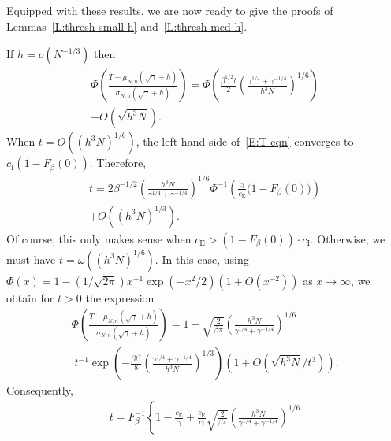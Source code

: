 \documentclass[final]{IEEEtran} %
\newcommand{\ce}{c_\text{E}}
\newcommand{\ci}{c_\text{I}}
\begin{document}
Equipped with these results, we are now ready to give the proofs of Lemmas~\ref{L:thresh-small-h} and~\ref{L:thresh-med-h}.
\begin{IEEEproof}
If $h = o\left(N^{-1/3}\right)$ then
\begin{multline*}
    \Phi \!
    \left(
        \frac{ T - \mu_{N,n}(\sqrt{\gamma} + h)}
             { \sigma_{N,n}(\sqrt{\gamma} + h) }
    \right)
    =
    \Phi \!
    \left(
    \frac{\beta^{1/2}t}{2}
    \left(
        \frac{\gamma^{1/4} + \gamma^{-1/4}}{ h^3 N }
    \right)^{1/6}
    \right)
    \\
    +
    O\left(\sqrt{h^3 N} \right)
    .
\end{multline*}
When $t = O\left((h^3 N)^{1/6}\right)$, the left-hand side of~\eqref{E:T-eqn} converges to $\ci ( 1 - F_\beta(0))$.  Therefore,
\begin{multline*}
    t
    =
    2
    \beta^{-1/2}
    \left(
        \frac{ h^3 N }{\gamma^{1/4} + \gamma^{-1/4}}
    \right)^{1/6}
    \Phi^{-1}
    \left(
        \frac{\ci}{\ce}
        \Big( 1 - F_\beta(0) \Big)
    \right)
    \\
    +
    O\left( (h^3 N)^{1/3} \right)
    .
\end{multline*}
Of course, this only makes sense when $\ce > (1 - F_\beta(0)) \cdot \ci$.
Otherwise, we must have $t = \omega\left((h^3 N)^{1/6} \right)$.  In this
case, using $\Phi(x) = 1 - (1/\sqrt{2 \pi}) x^{-1} \exp(-x^2/2)(1 + O(x^{-2}))$
as $x \to \infty$, we obtain for $t > 0$ the expression
\begin{multline*}
    \Phi
    \left(
        \frac{ T - \mu_{N,n}(\sqrt{\gamma} + h)}
             { \sigma_{N,n}(\sqrt{\gamma} + h) }
    \right)
    =
    1
    -
    \sqrt{\frac{2}{\beta \pi}}
    \left(
        \frac{ h^3 N }{\gamma^{1/4} + \gamma^{-1/4}}
    \right)^{1/6}
    \\
    \cdot t^{-1}
    \exp
    \left(
        -\frac{\beta t^2}{8}
        \left(
            \frac{\gamma^{1/4} + \gamma^{-1/4}}{ h^3 N }
        \right)^{1/3}
    \right)
    \left( 1 + O \left(\sqrt{h^3 N}/t^3 \right) \right).
\end{multline*}
Consequently,
\begin{multline*}
    t
    = F_\beta^{-1}
       \left\{
           1 - \frac{\ce}{\ci}
           +
           \frac{\ce}{\ci}
           \sqrt{\frac{2}{\beta \pi}}
           \left(
               \frac{ h^3 N }{\gamma^{1/4} + \gamma^{-1/4}}
           \right)^{1/6}
    \right.
    \\

\end{multline*}
\end{IEEEproof}
\end{document}
